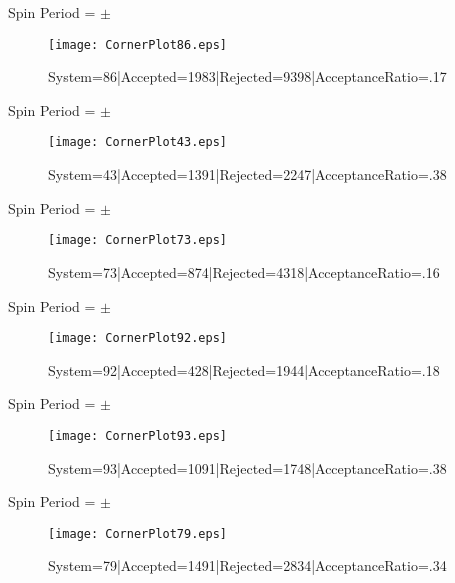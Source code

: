 \documentclass[10pt]{article}
\begin{document}
\begin{center}
        Spin Period = $\pm$ 
\begin{figure}[h] 
        \texttt{[image: CornerPlot86.eps]}
        \caption{System=86|Accepted=1983|Rejected=9398|AcceptanceRatio=.17}
        \label{S86}
        \centering
        \end{figure}
        \end{center}
\begin{center}
        Spin Period = $\pm$ 
\begin{figure}[h] 
        \texttt{[image: CornerPlot43.eps]}
        \caption{System=43|Accepted=1391|Rejected=2247|AcceptanceRatio=.38}
        \label{S43}
        \centering
        \end{figure}
        \end{center}
\begin{center}
        Spin Period = $\pm$ 
\begin{figure}[h] 
        \texttt{[image: CornerPlot73.eps]}
        \caption{System=73|Accepted=874|Rejected=4318|AcceptanceRatio=.16}
        \label{S73}
        \centering
        \end{figure}
        \end{center}
\begin{center}
        Spin Period = $\pm$ 
\begin{figure}[h] 
        \texttt{[image: CornerPlot92.eps]}
        \caption{System=92|Accepted=428|Rejected=1944|AcceptanceRatio=.18}
        \label{S92}
        \centering
        \end{figure}
        \end{center}
\begin{center}
        Spin Period = $\pm$ 
\begin{figure}[h] 
        \texttt{[image: CornerPlot93.eps]}
        \caption{System=93|Accepted=1091|Rejected=1748|AcceptanceRatio=.38}
        \label{S93}
        \centering
        \end{figure}
        \end{center}
\begin{center}
        Spin Period = $\pm$ 
\begin{figure}[h] 
        \texttt{[image: CornerPlot79.eps]}
        \caption{System=79|Accepted=1491|Rejected=2834|AcceptanceRatio=.34}
        \label{S79}
        \centering
        \end{figure}
        \end{center}
\end{document}
